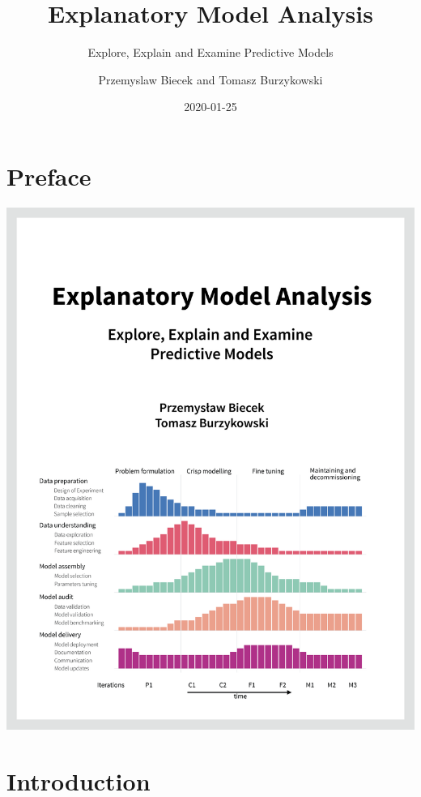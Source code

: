 \documentclass[12pt,]{krantz}
\title{Explanatory Model Analysis}
\subtitle{Explore, Explain and Examine Predictive Models}
\author{Przemyslaw Biecek and Tomasz Burzykowski}
\date{2020-01-25}
\begin{document}
\maketitle

{
\hypersetup{linkcolor=black}
\setcounter{tocdepth}{2}
\tableofcontents
}
\listoftables
\listoffigures
\hypertarget{preface}{%
\section*{Preface}\label{preface}}

\begin{center}\includegraphics[width=0.99\linewidth]{figure/front} \end{center}

\hypertarget{introduction}{%
\section{Introduction}\label{introduction}}
\end{document}
